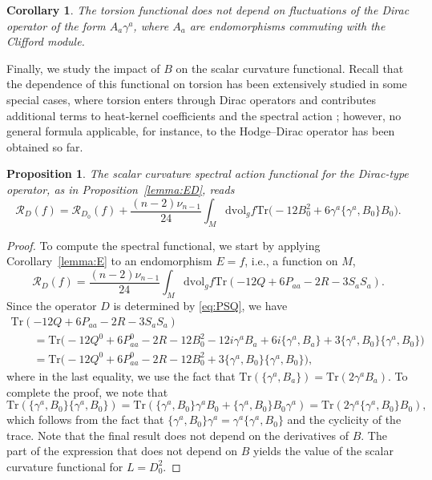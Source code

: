 \documentclass[pdftex]{sigma}
\numberwithin{equation}{section}
\newtheorem{Corollary}[Theorem]{Corollary}
\newtheorem{Proposition}[Theorem]{Proposition}
\theoremstyle{definition}
\def\Tr{\mathrm{Tr}}
\def\dv{\mathrm{dvol}_g}
\begin{document}
\begin{Corollary}
	The torsion functional does not depend on fluctuations of the Dirac operator of the form $A_a \gamma^a$, where $A_a$ are endomorphisms commuting with the Clifford module.
\end{Corollary}

Finally, we study the impact of $B$ on the scalar curvature functional. Recall that the dependence of this functional on torsion has been extensively studied in some special cases, where torsion enters through Dirac operators and contributes additional terms to heat-kernel coefficients and the spectral action \cite{Iochum12,Pfaffle12}; however, no general formula applicable, for instance, to the Hodge--Dirac operator has been obtained so far.
	\begin{Proposition}
		\label{prop:SA}
		The scalar curvature spectral action functional for the Dirac-type operator, as in Proposition~{\rm\ref{lemma:ED}}, reads
		\[
				\mathscr{R}_D(f)=\mathscr{R}_{D_0}(f)+ \frac{(n-2)\nu_{n-1}}{24}\int_M \dv f \Tr\bigl(
				-12B_0^2 + 6\gamma^a\{\gamma^a,B_0\}B_0\bigr).
			\]
	\end{Proposition}
	
	\begin{proof}
		To compute the spectral functional, we start by applying Corollary~\ref{lemma:E} to an endomorphism $E=f$, i.e., a function on $M$,
		\[
			\mathscr{R}_D(f)=\frac{(n-2)\nu_{n-1}}{24}\int_M \dv f \Tr(-12Q+6P_{aa}-2R-3S_aS_a).
		\]
		Since the operator $D$ is determined by \eqref{eq:PSQ}, we have
		\begin{gather*}
				\Tr(-12Q+6P_{aa}-2R-3S_aS_a)\\
\qquad= \Tr\bigl(-12Q^0+6P^0_{aa}-2R-12B_0^2-12i\gamma^aB_a
				+6i\{\gamma^a,B_a\}+3\{\gamma^a,B_0\}\{\gamma^a,B_0\}\bigr)\\
				\qquad=\Tr\bigl(-12Q^0+6P^0_{aa}-2R-12B_0^2+3\{\gamma^a,B_0\}\{\gamma^a,B_0\}\bigr),
			\end{gather*}
		where in the last equality, we use the fact that $\Tr(\{\gamma^a,B_a\})=\Tr(2\gamma^aB_a)$. To complete the proof, we note that
		\[
				\Tr(\{\gamma^a,B_0\}\{\gamma^a,B_0\})=\Tr (\{\gamma^a,B_0\}\gamma^aB_0+\{\gamma^a,B_0\}B_0\gamma^a) =\Tr(2\gamma^a\{\gamma^a,B_0\}B_0),
			\]
		which follows from the fact that $\{\gamma^a,B_0\}\gamma^a=\gamma^a\{\gamma^a,B_0\}$ and the cyclicity of the trace.
		Note that the final result does not depend on the derivatives of $B$. The part of the expression that does not depend on $B$ yields the value of the scalar curvature functional for $L=D_0^2$.
	\end{proof}
	
\end{document}
